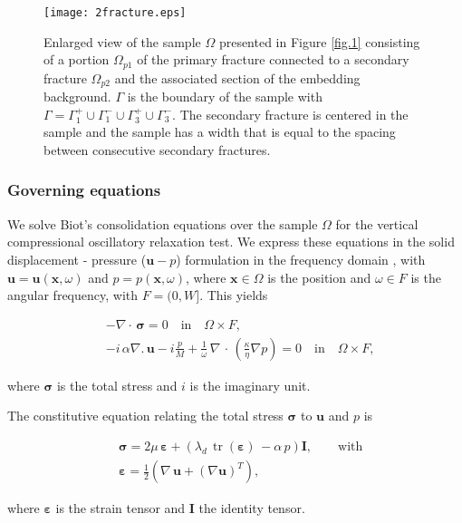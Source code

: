 \documentclass[draft]{agujournal2019}
\DeclareMathOperator{\tr}{tr}
\begin{document}
 \begin{figure}[!ht]
\centering
        \texttt{[image: 2fracture.eps]}
\caption{ Enlarged view of the sample $\Omega$ presented in Figure \ref{fig.1} consisting of a portion $\Omega_{p1}$ of the primary fracture connected to a secondary fracture $\Omega_{p2}$ and the associated section of the embedding background. $\Gamma$ is the boundary of the sample with $\Gamma = \Gamma_1^+ \cup \Gamma_1^- \cup \Gamma_3^+ \cup \Gamma_3^- $. The secondary fracture is centered in the sample and the sample has a width that is equal to the spacing between consecutive secondary fractures.
}
\label{fig.2}
\end{figure}

\subsubsection{Governing equations}

We solve Biot's consolidation equations \cite{Biot1941} over the sample $\Omega$  for the vertical compressional oscillatory relaxation test. 
We express these equations in the solid displacement - pressure ($\bm{u}-p$) formulation in the frequency domain \cite{Quintal2011,Favino2020},  with $\bm{u} = \bm{u}(\bm{x}, \omega)$ and $p = p(\bm{x},\omega)$, where $\bm{x} \in \Omega$ is the position  and $\omega \in F$ is the angular frequency, with $F =(0,W]$. This yields
\begin{linenomath*}
\begin{equation}\label{Eq.6}
\begin{split}
& - \nabla \cdot \, \bm{\sigma} =0  \quad  \textrm{in} \quad \Omega \times F,  \\
& - i \, \alpha \nabla . \, \bm{u} -i \frac{p}{M} + \frac{1}{\omega} \,\nabla \, \cdot \, \left( \frac{\kappa}{\eta} \nabla p\right)  =0 \quad  \textrm{in} \quad \Omega \times F,
\end{split}
\end{equation}
\end{linenomath*}
where $\bm{\sigma}$ is the total stress and $i$ is the imaginary unit.

The constitutive equation relating the total stress $\bm{\sigma}$ to $\bm{u}$ and $p$ is
\begin{linenomath*}
\begin{equation}\label{Eq.7}
\begin{split}
& \bm{\sigma} =  2\mu \, \bm{\varepsilon} +  \left( \lambda_d \,  \tr( \bm{\varepsilon})\, - \alpha \,p \right) \bm{I}, \qquad \text{with}\\
& \bm{\varepsilon} = \frac{1}{2} \left( \nabla \,\bm{u} + ({\nabla  \bm{u}})^T  \right),
\end{split}
\end{equation}
\end{linenomath*}
where $\bm{\varepsilon}$ is the strain tensor and $\bm{I}$ the identity tensor. 
\end{document}
